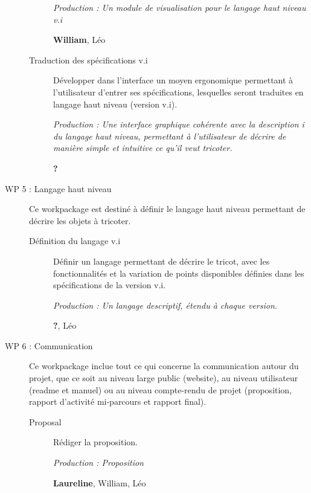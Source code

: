 \documentclass{article}
\begin{document}
\begin{description}
\begin{description}
    \textit{Production : Un module de visualisation pour le langage haut niveau v.i}

    \textbf{William}, Léo %

  \item[Traduction des spécifications v.i] Développer dans l'interface un moyen ergonomique permettant à l'utilisateur d'entrer ses spécifications, lesquelles seront traduites en langage haut niveau (version v.i).

    \textit{Production : Une interface graphique cohérente avec la description i du langage haut niveau, permettant à l'utilisateur de décrire de manière simple et intuitive ce qu'il veut tricoter.}

    \textbf{?}
  \end{description}

\medskip

\item[WP 5 : Langage haut niveau] Ce workpackage est destiné à définir le langage haut niveau permettant de décrire les objets à tricoter.

  \begin{description}
  \item[Définition du langage v.i] Définir un langage permettant de décrire le tricot, avec les fonctionnalités et la variation de points disponibles définies dans les spécifications de la version v.i.

    \textit{Production : Un langage descriptif, étendu à chaque version.}

    \textbf{?}, Léo
  \end{description}

\medskip

\item[WP 6 : Communication] Ce workpackage inclue tout ce qui concerne la communication autour du projet, que ce soit au niveau large public (website), au niveau utilisateur (readme et manuel) ou au niveau compte-rendu de projet (proposition, rapport d'activité mi-parcours et rapport final).


  \begin{description}
  \item[Proposal] Rédiger la proposition.

    \textit{Production : Proposition}

    \textbf{Laureline}, William, Léo


\end{description}
\end{description}
\end{document}
